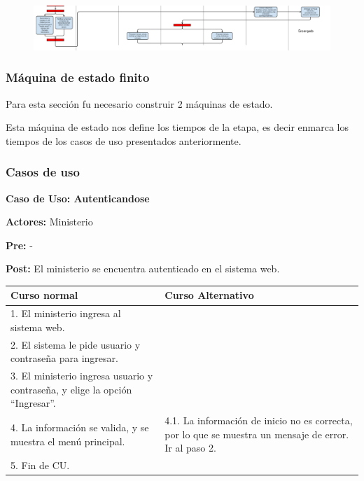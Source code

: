 \begin{figure}[h!]
\centering
\includegraphics[scale=0.5]{imagenes/actividad/actividadPreparacion3}
\end{figure}

\subsubsection{Máquina de estado finito}

Para esta sección fu necesario construir 2 máquinas de estado.

\begin{figure}[H]
\centering
\end{figure}

Esta máquina de estado nos define los tiempos de la etapa, es decir enmarca los tiempos de los casos de uso presentados anteriormente.

\begin{figure}[H]
\centering
\end{figure}


\subsubsection{Casos de uso}

\textbf{Caso de Uso: Autenticandose}

\textbf{Actores:} Ministerio

\textbf{Pre:} -

\textbf{Post:} El ministerio se encuentra autenticado en el sistema web.
\begin{table}[h!]
	
 \begin{tabular}{|p{7.5cm} | p{7.5cm}|} 
 \hline
 \textbf{Curso normal} & \textbf{Curso Alternativo} \\
 \hline
 1. El ministerio ingresa al sistema web. & \\
 \hline
 
 2. El sistema le pide usuario y contraseña para ingresar. & \\
 \hline 
 3. El ministerio ingresa usuario y contraseña, y elige la opción “Ingresar”. & \\
 \hline 
 4. La información se valida, y se muestra el menú principal. & 
4.1. La información de inicio no es correcta, por lo que se muestra un mensaje de error. Ir al paso 2.
\\
 \hline 
 5. Fin de CU. & \\

 \hline
 \end{tabular}

\end{table}


